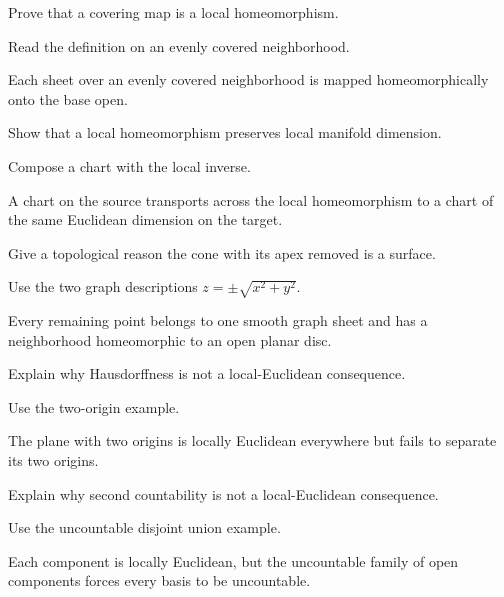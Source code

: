 \begin{exercise}\label{exr:vii01-19}
Prove that a covering map is a local homeomorphism.
\end{exercise}
\begin{hint}
Read the definition on an evenly covered neighborhood.
\end{hint}
\begin{solution}Each sheet over an evenly covered neighborhood is mapped homeomorphically onto the base open.\end{solution}

\begin{exercise}\label{exr:vii01-20}
Show that a local homeomorphism preserves local manifold dimension.
\end{exercise}
\begin{hint}
Compose a chart with the local inverse.
\end{hint}
\begin{solution}A chart on the source transports across the local homeomorphism to a chart of the same Euclidean dimension on the target.\end{solution}

\begin{exercise}\label{exr:vii01-21}
Give a topological reason the cone with its apex removed is a surface.
\end{exercise}
\begin{hint}
Use the two graph descriptions \(z=\pm\sqrt{x^2+y^2}\).
\end{hint}
\begin{solution}Every remaining point belongs to one smooth graph sheet and has a neighborhood homeomorphic to an open planar disc.\end{solution}

\begin{exercise}\label{exr:vii01-22}
Explain why Hausdorffness is not a local-Euclidean consequence.
\end{exercise}
\begin{hint}
Use the two-origin example.
\end{hint}
\begin{solution}The plane with two origins is locally Euclidean everywhere but fails to separate its two origins.\end{solution}

\begin{exercise}\label{exr:vii01-23}
Explain why second countability is not a local-Euclidean consequence.
\end{exercise}
\begin{hint}
Use the uncountable disjoint union example.
\end{hint}
\begin{solution}Each component is locally Euclidean, but the uncountable family of open components forces every basis to be uncountable.\end{solution}

